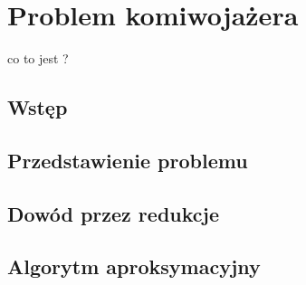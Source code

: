 \chapter{Problem komiwojażera}
co to jest ?
\section{Wstęp}

\section{Przedstawienie problemu}

\section{Dowód przez redukcje}

\section{Algorytm aproksymacyjny}